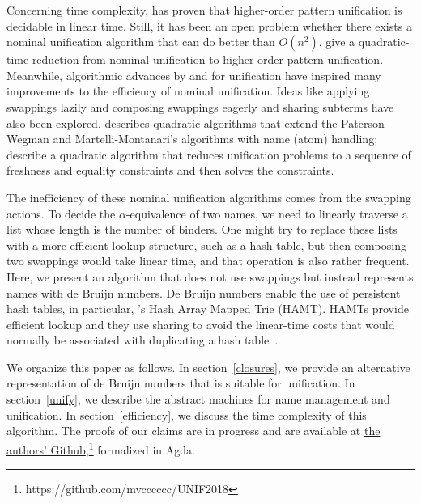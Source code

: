 \documentclass[a4paper,UKenglish]{lipics-v2016}
\begin{document}
Concerning time complexity, \citet{qian_unification_1996} has proven that
higher-order pattern unification is decidable in linear time.
Still, it has been an open problem whether there exists a nominal
unification algorithm that can do better than
$O(n^2)$. \citet{levy_nominal_2012} give a quadratic-time reduction
from nominal unification to higher-order pattern unification.
Meanwhile, algorithmic advances by \citet{paterson_linear_1978} and
\citet{martelli_efficient_1982} for unification have inspired many
improvements to the efficiency of nominal unification. Ideas
like applying swappings lazily and composing swappings eagerly and
sharing subterms have also been explored. \citet{calves_complexity_2010}
describes quadratic algorithms that extend the Paterson-Wegman and
Martelli-Montanari's algorithms with name (atom) handling;
\citet{levy_efficient_2010} describe a quadratic algorithm that
reduces unification problems to a sequence of freshness and equality
constraints and then solves the constraints.

The inefficiency of these nominal unification algorithms comes from
the swapping actions. To decide the $\alpha$-equivalence of
two names, we need to linearly traverse a list whose length 
is the number of binders. One might try to replace these
lists with a more efficient lookup structure, such as a hash table,
but then composing two swappings would take linear time, and that
operation is also rather frequent. Here, we present an algorithm that
does not use swappings but instead represents names with de Bruijn
numbers. De Bruijn numbers enable the use of persistent hash tables, in
particular, \citeauthor{bagwell_ideal_2001}'s Hash Array Mapped Trie
(HAMT). HAMTs provide efficient lookup and
they use sharing to avoid the linear-time costs that would normally be
associated with duplicating a hash table~\citep{bagwell_ideal_2001}.

We organize this paper as follows. In section~\ref{closures}, we provide
an alternative representation of de Bruijn numbers that is suitable
for unification. In section~\ref{unify}, we describe the abstract
machines for name management and unification. In
section~\ref{efficiency}, we discuss the time complexity of this
algorithm. The proofs of our claims are in progress and are available
at \href{https://github.com/mvcccccc/UNIF2018}{the authors' Github},\footnote{https://github.com/mvcccccc/UNIF2018}
formalized in Agda.
\end{document}
